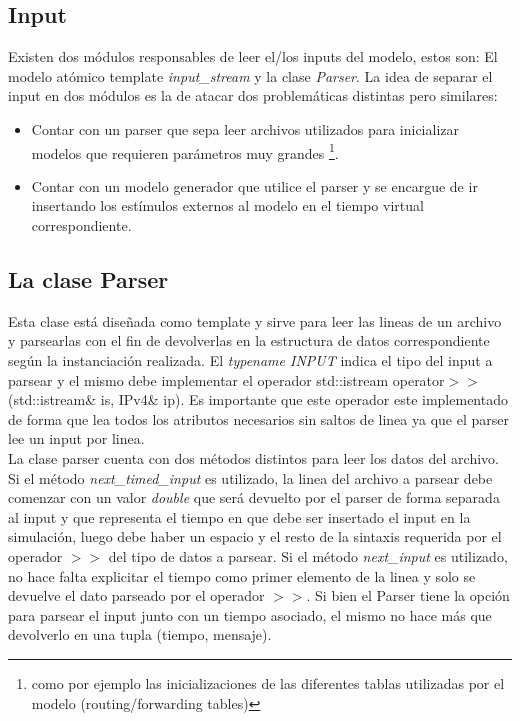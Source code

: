 \documentclass[10pt,a4paper]{article}
\begin{document}
\subsection{Input}
Existen dos módulos responsables de leer el/los inputs del modelo, estos son: El modelo atómico template \textit{input\_stream} y la clase \textit{Parser}. La idea de separar el input en dos módulos es la de atacar dos problemáticas distintas pero similares:

\begin{itemize}
\item Contar con un parser que sepa leer archivos utilizados para inicializar modelos que requieren parámetros muy grandes \footnote{como por ejemplo las inicializaciones de las diferentes tablas utilizadas por el modelo (routing/forwarding tables)}.
\item Contar con un modelo generador que utilice el parser y se encargue de ir insertando los estímulos externos al modelo en el tiempo virtual correspondiente.\\
\end{itemize}

\newpage

\subsection{La clase Parser}
Esta clase está diseñada como template y sirve para leer las lineas de un archivo y parsearlas con el fin de devolverlas en la estructura de datos correspondiente según la instanciación realizada. El \textit{typename INPUT} indica el tipo del input a parsear y el mismo debe implementar el operador std::istream \textsf{operator}$>>$(\textsf{std::istream}\& is, \textsf{IPv4}\& ip). Es importante que este operador este implementado de forma que lea todos los atributos necesarios sin saltos de linea ya que el parser lee un input por linea.\\

La clase parser cuenta con dos métodos distintos para leer los datos del archivo. Si el método \textit{next\_timed\_input} es utilizado, la linea del archivo a parsear debe comenzar con un valor \textit{double} que será devuelto por el parser de forma separada al input y que representa el tiempo en que debe ser insertado el input en la simulación, luego debe haber un espacio y el resto de la sintaxis requerida por el operador $>>$ del tipo de datos a parsear. Si el método \textit{next\_input} es utilizado, no hace falta explicitar el tiempo como primer elemento de la linea y solo se devuelve el dato parseado por el operador $>>$. Si bien el Parser tiene la opción para parsear el input junto con un tiempo asociado, el mismo no hace más que devolverlo en una tupla (tiempo, mensaje).\\
\end{document}
